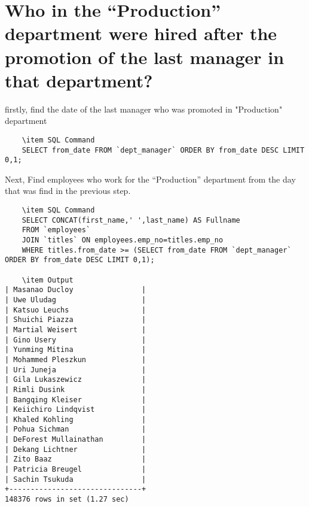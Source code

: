\documentclass[13pt,a4paper]{report}
\begin{document}
\section{ Who in the “Production” department were hired after the promotion of the last manager in that department? }
firstly, find the date of the last manager who was promoted in "Production" department
\begin{itemize}
\begin{lstlisting}
	\item SQL Command
	SELECT from_date FROM `dept_manager` ORDER BY from_date DESC LIMIT 0,1;
\end{lstlisting}
Next, Find employees who work for the “Production” department from the day that was find in the previous step.
\end{itemize}
\begin{lstlisting}
	\item SQL Command
	SELECT CONCAT(first_name,' ',last_name) AS Fullname 
	FROM `employees` 
	JOIN `titles` ON employees.emp_no=titles.emp_no 
	WHERE titles.from_date >= (SELECT from_date FROM `dept_manager` ORDER BY from_date DESC LIMIT 0,1);
	
	\item Output
| Masanao Ducloy                |
| Uwe Uludag                    |
| Katsuo Leuchs                 |
| Shuichi Piazza                |
| Martial Weisert               |
| Gino Usery                    |
| Yunming Mitina                |
| Mohammed Pleszkun             |
| Uri Juneja                    |
| Gila Lukaszewicz              |
| Rimli Dusink                  |
| Bangqing Kleiser              |
| Keiichiro Lindqvist           |
| Khaled Kohling                |
| Pohua Sichman                 |
| DeForest Mullainathan         |
| Dekang Lichtner               |
| Zito Baaz                     |
| Patricia Breugel              |
| Sachin Tsukuda                |
+-------------------------------+
148376 rows in set (1.27 sec)

\end{lstlisting}
\end{document}
